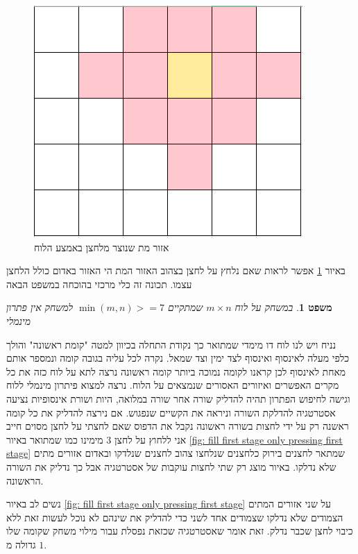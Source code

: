 \documentclass[12pt,twoside]{article}
\newtheorem{theorem}{משפט}[section]
\begin{document}
\begin{figure}[ht]
    \caption{אזור מת שנוצר מלחצן באמצע הלוח}
    \label{fig: dead zone}
    \unsethebrew
    \centering
    \includegraphics[width=.7\textwidth,height=.7\textheight,keepaspectratio]{images/dead_zone.PNG}
\end{figure}
\sethebrew

באיור 
\ref{fig: dead zone}
אפשר לראות שאם נלחץ על לחצן בצהוב האזור המת הי האזור באדום כולל 
הלחצן עצמו.
תכונה זה כלי מרכזי בהוכחה במשפט הבאה

\begin{theorem}
    \label{thrm: bigger then 7x7 board no minimal solution}
    במשחק על לוח 
    $m \times n$
    שמתקיים
    $\min(m,n) >= 7$
    למשחק אין פתרון מינמלי
\end{theorem}

נניח ויש לנו לוח דו מימדי שמתואר כך נקודת התחלה בכיוון למטה 
"קומת ראשונה"
והולך כלפי מעלה לאינסוף 
ואינסוף לצד ימין וצד שמאל.
נקרה לכל עליה בגובה
קומה ונמספר אותם מאחת לאינסוף לכן קראנו לקומה נמוכה ביותר קומה ראשונה
נרצה לתא על לוח כזה את כל מקרים האפשרים ואיזורים האסורים שנמצאים על הלוח.
נרצה למצוא פיתרון מינמלי ללוח
וגישה לחיפוש הפתרון תהיה
להדליק שורה אחר שורה במלואה,
היות ושורת אינסופיות נציעה אסטרטגיה להדלקת השורה וניראה את הקשיים שנפגוש.
אם נירצה להדליק 
את כל קומה ראשנה רק על ידי לחצות 
בשורה ראשונה נקבל את הדפוס 
שאם לחצתי על לחצן מסוים חייב אני ללחוץ על לחצן
$3$
מימינו
כמו שמתואר באיור
\ref{fig: fill first stage only pressing first stage}
שמתאר לחצנים בירוק כלחצנים שנלחצו 
צהוב לחצנים שנלדקו ובאדום אזורים מתים שלא נדלקו.
באיור מוצג רק שתי לחצות עוקבות של אסטרטגיה אבל כך נדליק את השורה הראשונה.

נשים לב באיור 
\ref{fig: fill first stage only pressing first stage}
על שני אזורים המתים הצמודים שלא נדלקו שצמודים אחד לשני כדי להדליק את שינהם
לא נוכל לעשות זאת ללא כיבוי לחצן שכבר נדלק.
זאת אומר שאסטרטגיה שכזאת
נפסלת עבור מילוי משחק שקומה שלו גדולה מ
$1$.
\end{document}
